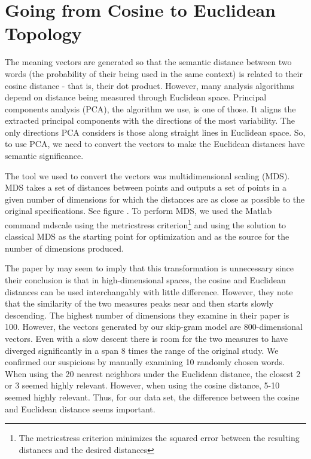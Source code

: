 \documentclass[eric_thesis.tex]{subfiles}
\begin{document}
\section{Going from Cosine to Euclidean Topology}

The meaning vectors are generated so that the semantic distance between two 
words (the probability of their being used in the same context) is related to 
their cosine distance - that is, their dot product. However, many analysis 
algorithms depend on distance being measured through Euclidean space. Principal 
components analysis (PCA), the algorithm we use, is one of those. It aligns the 
extracted principal components with the directions of the most variability. The 
only directions PCA considers is those along straight lines in Euclidean space. 
So, to use PCA, we need to convert the vectors to make the Euclidean distances 
have semantic significance. 

The tool we used to convert the vectors was multidimensional scaling (MDS). MDS 
takes a set of distances between points and outputs a set of points in a given 
number of dimensions for which the distances are as close as possible to the 
original specifications. See figure . To 
perform MDS, we used the Matlab command mdscale using the metricstress 
criterion\footnote{The metricstress criterion minimizes the squared error 
between the resulting distances and the desired distances} and using the 
solution to classical MDS as the starting point for optimization and as the 
source for the number of dimensions produced.

The paper  by  may seem to imply that this 
transformation is unnecessary since their conclusion is that in high-dimensional 
spaces, the cosine and Euclidean distances can be used interchangably with 
little difference. However, they note that the similarity of the two measures 
peaks near  and then starts slowly 
descending. The highest number of dimensions they examine in their paper is 100. 
However, the vectors generated by our skip-gram model are 800-dimensional 
vectors. Even with a slow descent there is room for the two measures to have 
diverged significantly in a span 8 times the range of the original study. We 
confirmed our suspicions by manually examining 10 randomly chosen words. When 
using the 20 nearest neighbors under the Euclidean distance, the closest 2 or 3 
seemed highly relevant. However, when using the cosine distance, 5-10 seemed 
highly relevant. Thus, for our data set, the difference between the cosine and 
Euclidean distance seems important. 
\end{document}
